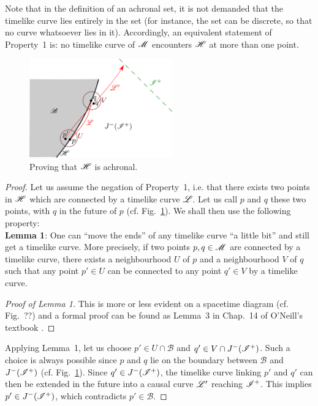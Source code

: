 Note that in the definition of an achronal set, it is not demanded that the timelike
curve lies entirely in the set (for instance, the set can be discrete, so that no curve
whatsoever lies in it). Accordingly,
an equivalent statement of Property~1 is: no timelike curve of $\mathscr{M}$
encounters $\mathscr{H}$ at more than one point.

\begin{figure}
\centerline{\includegraphics[width=0.55\textwidth]{glo_achronal.pdf}}
\caption[]{\label{f:glo:achronal} \footnotesize
Proving that $\mathscr{H}$ is achronal.}
\end{figure}

\begin{proof}
Let us assume the negation of Property~1, i.e. that there exists two points
in $\mathscr{H}$ which are connected by a timelike curve $\mathscr{L}$. Let us call $p$ and
$q$ these two points, with $q$ in the future of $p$ (cf. Fig.~\ref{f:glo:achronal}).
We shall then use the following property:\\[1ex]
\textbf{Lemma 1}: One can ``move the ends'' of any timelike curve
``a little bit'' and still get a timelike curve. More precisely,
if two points $p,q\in\mathscr{M}$ are connected by a timelike curve,
there exists
a neighbourhood $U$ of $p$ and a neighbourhood $V$ of $q$ such that
any point $p'\in U$ can be connected to any point $q'\in V$ by a timelike curve.
\begin{proof}[Proof of Lemma 1]
This is more or less evident on a spacetime diagram (cf. Fig.~??)
and a formal proof
can be found as Lemma~3
in Chap.~14 of O'Neill's textbook \cite{ONeil83}.
\end{proof}
Applying Lemma~1,
let us choose $p'\in U\cap\mathscr{B}$ and $q'\in V\cap J^-(\mathscr{I}^+)$. Such a choice is
always possible since $p$ and $q$ lie on the boundary between $\mathscr{B}$
and $J^-(\mathscr{I}^+)$ (cf. Fig.~\ref{f:glo:achronal}).
Since $q'\in J^-(\mathscr{I}^+)$, the timelike curve linking $p'$ and $q'$ can then be extended in the future into a causal curve $\mathscr{L}'$ reaching $\mathscr{I}^+$. This implies $p'\in J^-(\mathscr{I}^+)$,
which contradicts $p'\in\mathscr{B}$.
\end{proof}


